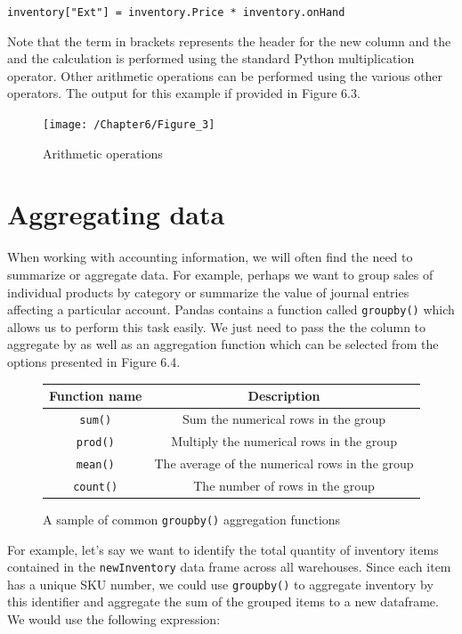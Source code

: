 \documentclass{book}
\begin{document}
\texttt{inventory["Ext"] = inventory.Price * inventory.onHand}

Note that the term in brackets represents the header for the new column and the and the calculation is performed using the standard Python multiplication operator. Other arithmetic operations can be performed using the various other operators. The output for this example if provided in Figure 6.3.

\begin{figure}[h]
	\caption{Arithmetic operations}
	\centering\texttt{[image: /Chapter6/Figure\_3]}
\end{figure}

\section{Aggregating data}
When working with accounting information, we will often find the need to summarize or aggregate data. For example, perhaps we want to group sales of individual products by category or summarize the value of journal entries affecting a particular account. Pandas contains a function called \texttt{groupby()} which allows us to perform this task easily. We just need to pass the the column to aggregate by as well as an aggregation function which can be selected from the options presented in Figure 6.4.

\begin{figure}[h]
	\caption{A sample of common \texttt{groupby()} aggregation functions}
	\centering
	\begin{center}
		\begin{tabular}{|c | c|}
			\hline Function name & Description  \\ [0.5ex]
			\hline
			\texttt{sum()} & Sum the numerical rows in the group \\
			\hline
			\texttt{prod()} & Multiply the numerical rows in the group \\
			\hline
			\texttt{mean()} & The average of the numerical rows in the group \\
			\hline
			\texttt{count()} & The number of rows in the group \\
			\hline
		\end{tabular}
	\end{center}
\end{figure}

For example, let's say we want to identify the total quantity of inventory items contained in the \texttt{newInventory} data frame across all warehouses. Since each item has a unique SKU number, we could use \texttt{groupby()} to aggregate inventory by this identifier and aggregate the sum of the grouped items to a new dataframe. We would use the following expression:
\end{document}
